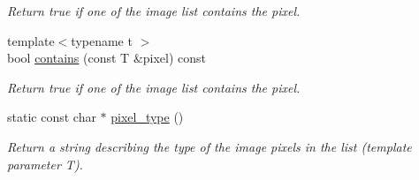 \begin{DoxyCompactItemize}
\begin{DoxyCompactList}\small\item\em Return {\ttfamily true} if one of the image list contains the pixel. \end{DoxyCompactList}\item 
\hypertarget{structcimg__library_1_1_c_img_list_a768cb2431a0f9c1619140a8232736aa1}{{\footnotesize template$<$typename t $>$ }\\bool \hyperlink{structcimg__library_1_1_c_img_list_a768cb2431a0f9c1619140a8232736aa1}{contains} (const T \&pixel) const }\label{structcimg__library_1_1_c_img_list_a768cb2431a0f9c1619140a8232736aa1}

\begin{DoxyCompactList}\small\item\em Return {\ttfamily true} if one of the image list contains the pixel. \end{DoxyCompactList}\item 
\hypertarget{structcimg__library_1_1_c_img_list_ac0a9bcd06776586c0f3663cc1a387c11}{static const char $\ast$ \hyperlink{structcimg__library_1_1_c_img_list_ac0a9bcd06776586c0f3663cc1a387c11}{pixel\-\_\-type} ()}\label{structcimg__library_1_1_c_img_list_ac0a9bcd06776586c0f3663cc1a387c11}

\begin{DoxyCompactList}\small\item\em Return a string describing the type of the image pixels in the list (template parameter {\ttfamily T}). \end{DoxyCompactList}\end{DoxyCompactItemize}
